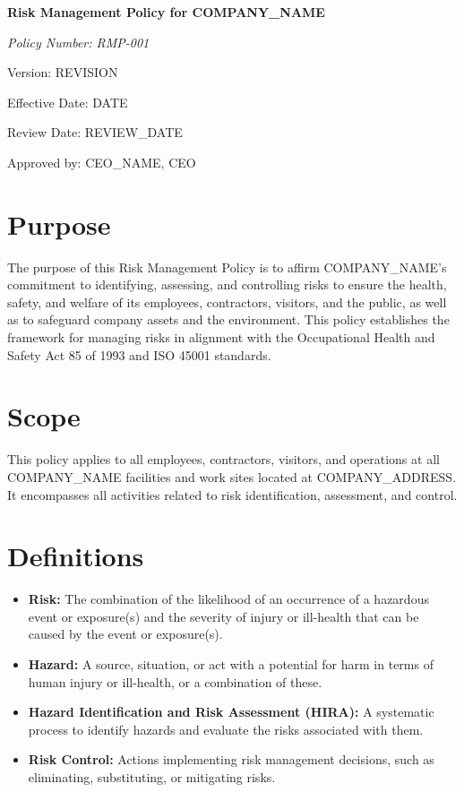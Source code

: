 \documentclass[12pt]{article}
\begin{document}
\begin{titlepage}
    \centering
    \vspace*{2cm}
    {\LARGE\bfseries Risk Management Policy for {{COMPANY_NAME}}\par}
    \vspace{1cm}
    {\large\itshape Policy Number: RMP-001\par}
    \vspace{0.5cm}
    {\normalsize Version: {{REVISION}}\par}
    \vspace{0.5cm}
    {\normalsize Effective Date: {{DATE}}\par}
    \vspace{0.5cm}
    {\normalsize Review Date: {{REVIEW_DATE}}\par}
    \vspace{2cm}
    {\normalsize Approved by: {{CEO_NAME}}, CEO\par}
\end{titlepage}

\section{Purpose}
The purpose of this Risk Management Policy is to affirm {{COMPANY_NAME}}'s commitment to identifying, assessing, and controlling risks to ensure the health, safety, and welfare of its employees, contractors, visitors, and the public, as well as to safeguard company assets and the environment. This policy establishes the framework for managing risks in alignment with the Occupational Health and Safety Act 85 of 1993 and ISO 45001 standards.

\section{Scope}
This policy applies to all employees, contractors, visitors, and operations at all {{COMPANY_NAME}} facilities and work sites located at {{COMPANY_ADDRESS}}. It encompasses all activities related to risk identification, assessment, and control.

\section{Definitions}
\begin{itemize}
    \item \textbf{Risk:} The combination of the likelihood of an occurrence of a hazardous event or exposure(s) and the severity of injury or ill-health that can be caused by the event or exposure(s).
    \item \textbf{Hazard:} A source, situation, or act with a potential for harm in terms of human injury or ill-health, or a combination of these.
    \item \textbf{Hazard Identification and Risk Assessment (HIRA):} A systematic process to identify hazards and evaluate the risks associated with them.
    \item \textbf{Risk Control:} Actions implementing risk management decisions, such as eliminating, substituting, or mitigating risks.
\end{itemize}
\end{document}
